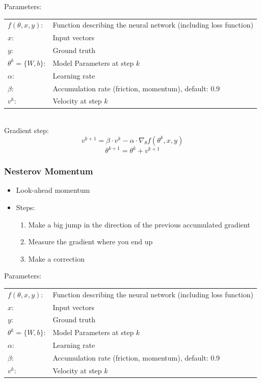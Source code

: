 \documentclass[10pt,a4paper]{article}
\begin{document}
Parameters: \\
\begin{tabular}{ll}
	$f(\theta, x, y)$: & Function describing the neural network (including loss function) \\
	$x$: & Input vectors \\
	$y$: & Ground truth \\
	$\theta^k = \{W, b\}$: & Model Parameters at step $k$\\
	$\alpha$: & Learning rate \\
	$\beta$: & Accumulation rate (friction, momentum), default: 0.9 \\
	$v^k$: & Velocity at step $k$ \\
\end{tabular} \\

Gradient step:
$$
	v^{k + 1} = \beta ⋅ v^k - \alpha ⋅ \nabla_\theta f(\theta^k, x, y)
$$
$$
	\theta^{k + 1} = \theta^k + v^{k + 1}
$$

\subsubsection{Nesterov Momentum}
\begin{itemize}
	\item Look-ahead momentum
	\item Steps:
	\begin{enumerate}
		\item Make a big jump in the direction of the previous accumulated gradient
		\item Measure the gradient where you end up
		\item Make a correction
	\end{enumerate}
\end{itemize}

Parameters: \\
\begin{tabular}{ll}
	$f(\theta, x, y)$: & Function describing the neural network (including loss function) \\
	$x$: & Input vectors \\
	$y$: & Ground truth \\
	$\theta^k = \{W, b\}$: & Model Parameters at step $k$\\
	$\alpha$: & Learning rate \\
	$\beta$: & Accumulation rate (friction, momentum), default: 0.9 \\
	$v^k$: & Velocity at step $k$ \\
\end{tabular} \\
\end{document}

